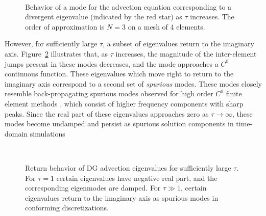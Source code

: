\documentclass[preprint,10pt]{elsarticle}
\begin{document}
\begin{figure}
\centering
{}
\hspace{.5em}
\hspace{.5em}
\\
\hspace{.5em}
\hspace{.5em}
\caption{Behavior of a mode for the advection equation corresponding to a divergent eigenvalue (indicated by the red star) as $\tau$ increases.  The order of approximation is $N=3$ on a mesh of 4 elements.} %
\label{fig:trackmodes1D}
\end{figure}

However, for sufficiently large $\tau$, a subset of eigenvalues return to the imaginary axis.  Figure~\ref{fig:spurious} illustrates that, as $\tau$ increases, the magnitude of the inter-element jumps present in these modes decreases, and the mode approaches a $C^0$ continuous function.  These eigenvalues which move right to return to the imaginary axis correspond to a second set of \emph{spurious} modes.  These modes closely resemble back-propagating spurious modes observed for high order $C^0$ finite element methods \cite{ainsworth2014dispersive}, which consist of higher frequency components with sharp peaks.  Since the real part of these eigenvalues approaches zero as $\tau\rightarrow \infty$, these modes become undamped and persist as spurious solution components in time-domain simulations \cite{hughes2014finite}

\begin{figure}
\centering
{}
\hspace{.5em}
\hspace{.5em}
\\
\hspace{.5em}
\hspace{.5em}
\caption{Return behavior of DG advection eigenvalues for sufficiently large $\tau$.  For $\tau = 1$ certain eigenvalues have negative real part, and the corresponding eigenmodes are damped.  For $\tau \gg 1$, certain eigenvalues return to the imaginary axis as spurious modes in conforming discretizations. }
\label{fig:spurious}
\end{figure}
\end{document}
